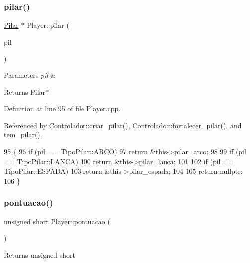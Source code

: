 \subsubsection{\texorpdfstring{pilar()}{pilar()}}
{\footnotesize\ttfamily \mbox{\hyperlink{class_pilar}{Pilar}} $\ast$ Player\+::pilar (\begin{DoxyParamCaption}\item[{Tipo\+Pilar}]{pil }\end{DoxyParamCaption})}


\begin{DoxyParams}{Parameters}
{\em pil} & \\
\hline
\end{DoxyParams}
\begin{DoxyReturn}{Returns}
Pilar$\ast$ 
\end{DoxyReturn}


Definition at line 95 of file Player.\+cpp.



Referenced by Controlador\+::criar\+\_\+pilar(), Controlador\+::fortalecer\+\_\+pilar(), and tem\+\_\+pilar().


\begin{DoxyCode}
95                                   \{
96     \textcolor{keywordflow}{if} (pil == TipoPilar::ARCO)
97         \textcolor{keywordflow}{return} &this->pilar\_arco;
98 
99     \textcolor{keywordflow}{if} (pil == TipoPilar::LANCA)
100         \textcolor{keywordflow}{return} &this->pilar\_lanca;
101 
102     \textcolor{keywordflow}{if} (pil == TipoPilar::ESPADA)
103         \textcolor{keywordflow}{return} &this->pilar\_espada;
104 
105     \textcolor{keywordflow}{return} \textcolor{keyword}{nullptr};
106 \}
\end{DoxyCode}
\mbox{\label{class_player_a945277689283bc50bd3afef306bf9740}} 
\subsubsection{\texorpdfstring{pontuacao()}{pontuacao()}}
{\footnotesize\ttfamily unsigned short Player\+::pontuacao (\begin{DoxyParamCaption}{ }\end{DoxyParamCaption})}

\begin{DoxyReturn}{Returns}
unsigned short 
\end{DoxyReturn}


